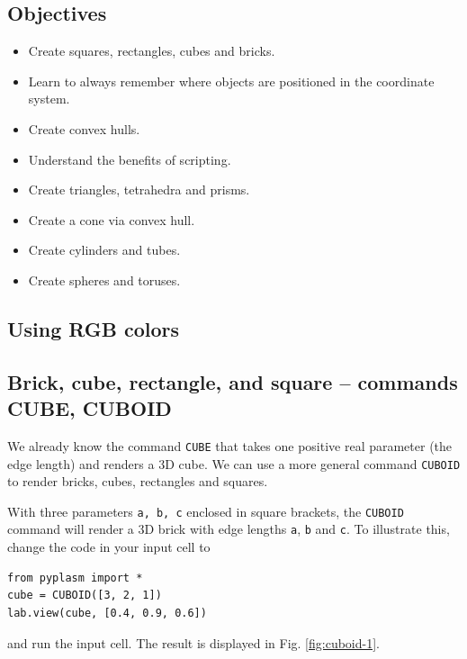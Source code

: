 \documentclass{article}
\begin{document}
\subsection{Objectives}
\begin{itemize}
\item Create squares, rectangles, cubes and bricks.
\item Learn to always remember where objects are positioned in the coordinate system.
\item Create convex hulls.
\item Understand the benefits of scripting.
\item Create triangles, tetrahedra and prisms.
\item Create a cone via convex hull.
\item Create cylinders and tubes.
\item Create spheres and toruses.
\end{itemize}


\subsection{Using RGB colors} \label{subsec:colors}
 
\subsection{Brick, cube, rectangle, and square -- commands CUBE, CUBOID}

We already know the command {\tt CUBE} that takes one positive real
parameter (the edge length) and renders a 3D cube. We can use a more general command {\tt CUBOID}
to render bricks, cubes, rectangles and squares.
   
With three parameters {\tt a, b, c} enclosed in square brackets, the {\tt CUBOID} command will 
render a 3D brick with edge lengths {\tt a}, {\tt b} and {\tt c}. To illustrate this, 
change the code in your input cell to  

\begin{verbatim}
from pyplasm import *
cube = CUBOID([3, 2, 1])
lab.view(cube, [0.4, 0.9, 0.6])
\end{verbatim}
and run the input cell. The result is displayed in Fig. \ref{fig:cuboid-1}.
\end{document}
